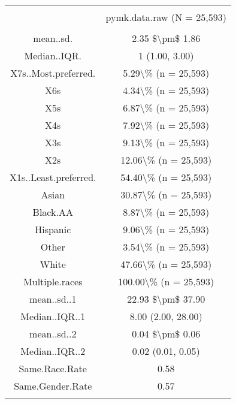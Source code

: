 
\begin{table}[!htbp] \centering 
  \caption{} 
  \label{} 
\begin{tabular}{@{\extracolsep{5pt}} cc} 
\\[-1.8ex]\hline 
\hline \\[-1.8ex] 
 & pymk.data.raw (N = 25,593) \\ 
\hline \\[-1.8ex] 
mean..sd. & 2.35 \$\textbackslash pm\$ 1.86 \\ 
Median..IQR. & 1 (1.00, 3.00) \\ 
X7s..Most.preferred. & 5.29\textbackslash \% (n = 25,593) \\ 
X6s & 4.34\textbackslash \% (n = 25,593) \\ 
X5s & 6.87\textbackslash \% (n = 25,593) \\ 
X4s & 7.92\textbackslash \% (n = 25,593) \\ 
X3s & 9.13\textbackslash \% (n = 25,593) \\ 
X2s & 12.06\textbackslash \% (n = 25,593) \\ 
X1s..Least.preferred. & 54.40\textbackslash \% (n = 25,593) \\ 
Asian & 30.87\textbackslash \% (n = 25,593) \\ 
Black.AA & 8.87\textbackslash \% (n = 25,593) \\ 
Hispanic & 9.06\textbackslash \% (n = 25,593) \\ 
Other & 3.54\textbackslash \% (n = 25,593) \\ 
White & 47.66\textbackslash \% (n = 25,593) \\ 
Multiple.races & 100.00\textbackslash \% (n = 25,593) \\ 
mean..sd..1 & 22.93 \$\textbackslash pm\$ 37.90 \\ 
Median..IQR..1 & 8.00 (2.00, 28.00) \\ 
mean..sd..2 & 0.04 \$\textbackslash pm\$ 0.06 \\ 
Median..IQR..2 & 0.02 (0.01, 0.05) \\ 
Same.Race.Rate & 0.58 \\ 
Same.Gender.Rate & 0.57 \\ 
\hline \\[-1.8ex] 
\end{tabular} 
\end{table} 
